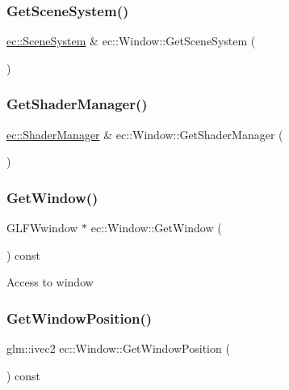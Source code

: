 \subsubsection{\texorpdfstring{Get\+Scene\+System()}{GetSceneSystem()}}
{\footnotesize\ttfamily \mbox{\hyperlink{classec_1_1_scene_system}{ec\+::\+Scene\+System}} \& ec\+::\+Window\+::\+Get\+Scene\+System (\begin{DoxyParamCaption}{ }\end{DoxyParamCaption})}

\mbox{\label{classec_1_1_window_a5f2d20a2d7b3bc05c29830164437d190}} 
\subsubsection{\texorpdfstring{Get\+Shader\+Manager()}{GetShaderManager()}}
{\footnotesize\ttfamily \mbox{\hyperlink{classec_1_1_shader_manager}{ec\+::\+Shader\+Manager}} \& ec\+::\+Window\+::\+Get\+Shader\+Manager (\begin{DoxyParamCaption}{ }\end{DoxyParamCaption})}

\mbox{\label{classec_1_1_window_a3131064635c5c422ac65b17eeaddae59}} 
\subsubsection{\texorpdfstring{Get\+Window()}{GetWindow()}}
{\footnotesize\ttfamily G\+L\+F\+Wwindow $\ast$ ec\+::\+Window\+::\+Get\+Window (\begin{DoxyParamCaption}{ }\end{DoxyParamCaption}) const}

Access to window \mbox{\label{classec_1_1_window_a04959818ec9c89bb982deefa5868cab5}} 
\subsubsection{\texorpdfstring{Get\+Window\+Position()}{GetWindowPosition()}}
{\footnotesize\ttfamily glm\+::ivec2 ec\+::\+Window\+::\+Get\+Window\+Position (\begin{DoxyParamCaption}{ }\end{DoxyParamCaption}) const}

